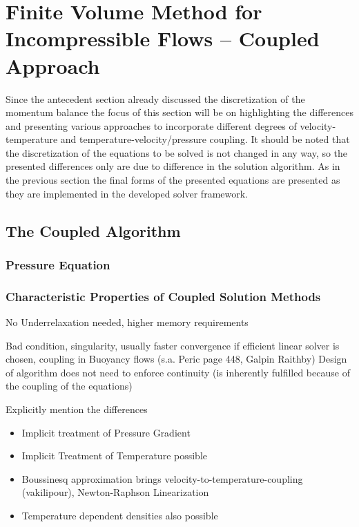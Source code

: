   \section{Finite Volume Method for Incompressible Flows -- Coupled Approach}

    Since the antecedent section already discussed the discretization of the momentum balance the focus of this section will be on highlighting the differences and presenting various approaches to incorporate different degrees of velocity-temperature and temperature-velocity/pressure coupling. It should be noted that the discretization of the equations to be solved is not changed in any way, so the presented differences only are due to difference in the solution algorithm. As in the previous section the final forms of the presented equations are presented as they are implemented in the developed solver framework. 

    \subsection{The Coupled Algorithm}
      
      \subsubsection{Pressure Equation}

      \subsubsection{Characteristic Properties of Coupled Solution Methods}

        No Underrelaxation needed, higher memory requirements

        Bad condition, singularity, usually faster convergence if efficient linear solver is chosen, coupling in Buoyancy flows (s.a. Peric page 448, Galpin Raithby)
        Design of algorithm does not need to enforce continuity (is inherently fulfilled because of the coupling of the equations)

        Explicitly mention the differences

        \begin{itemize}
          \item Implicit treatment of Pressure Gradient
          \item Implicit Treatment of Temperature possible
          \item Boussinesq approximation brings velocity-to-temperature-coupling (vakilipour), Newton-Raphson Linearization
          \item Temperature dependent densities also possible
        \end{itemize}

